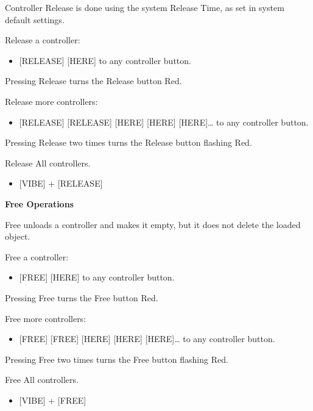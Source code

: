 \documentclass[
]{article}
\providecommand{\tightlist}{%
  \setlength{\itemsep}{0pt}\setlength{\parskip}{0pt}}
\begin{document}
Controller Release is done using the system Release Time, as set in system default settings.

Release a controller:

\begin{itemize}
\tightlist
\item
  {[}RELEASE{]} {[}HERE{]} to any controller button.
\end{itemize}

Pressing Release turns the Release button {Red}.

Release more controllers:

\begin{itemize}
\tightlist
\item
  {[}RELEASE{]} {[}RELEASE{]} {[}HERE{]} {[}HERE{]} {[}HERE{]}\ldots{} to any controller button.
\end{itemize}

Pressing Release two times turns the Release button {flashing Red}.

Release All controllers.

\begin{itemize}
\tightlist
\item
  {[}VIBE{]} + {[}RELEASE{]}
\end{itemize}

\textbf{Free Operations}

Free unloads a controller and makes it empty, but it does not delete the loaded object.

Free a controller:

\begin{itemize}
\tightlist
\item
  {[}FREE{]} {[}HERE{]} to any controller button.
\end{itemize}

Pressing Free turns the Free button {Red}.

Free more controllers:

\begin{itemize}
\tightlist
\item
  {[}FREE{]} {[}FREE{]} {[}HERE{]} {[}HERE{]} {[}HERE{]}\ldots{} to any controller button.
\end{itemize}

Pressing Free two times turns the Free button {flashing Red}.

Free All controllers.

\begin{itemize}
\tightlist
\item
  {[}VIBE{]} + {[}FREE{]}
\end{itemize}
\end{document}
